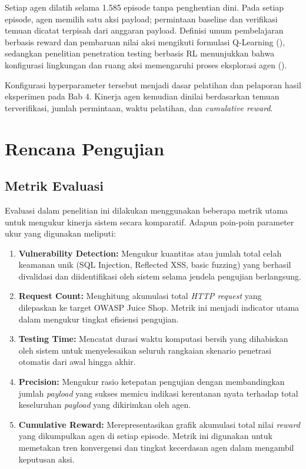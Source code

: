 Setiap agen dilatih selama 1.585 episode tanpa penghentian dini. Pada setiap episode, agen memilih satu aksi payload; permintaan baseline dan verifikasi temuan dicatat terpisah dari anggaran payload. Definisi umum pembelajaran berbasis reward dan pembaruan nilai aksi mengikuti formulasi Q-Learning (\cite{watkins1992qlearning,sutton2018}), sedangkan penelitian penetration testing berbasis RL menunjukkan bahwa konfigurasi lingkungan dan ruang aksi memengaruhi proses eksplorasi agen (\cite{ghanem2023hrl,zennaro2023}).

Konfigurasi hyperparameter tersebut menjadi dasar pelatihan dan pelaporan hasil eksperimen pada Bab 4. Kinerja agen kemudian dinilai berdasarkan temuan terverifikasi, jumlah permintaan, waktu pelatihan, dan \textit{cumulative reward}.

\section{Rencana Pengujian}

\subsection{Metrik Evaluasi}

Evaluasi dalam penelitian ini dilakukan menggunakan beberapa metrik utama untuk mengukur kinerja sistem secara komparatif. Adapun poin-poin parameter ukur yang digunakan meliputi:

\begin{enumerate}
    \item \textbf{Vulnerability Detection:} Mengukur kuantitas atau jumlah total celah keamanan unik (SQL Injection, Reflected XSS, basic fuzzing) yang berhasil divalidasi dan diidentifikasi oleh sistem selama jendela pengujian berlangsung.
    \item \textbf{Request Count:} Menghitung akumulasi total \textit{HTTP request} yang dilepaskan ke target OWASP Juice Shop. Metrik ini menjadi indicator utama dalam mengukur tingkat efisiensi pengujian.
    \item \textbf{Testing Time:} Mencatat durasi waktu komputasi bersih yang dihabiskan oleh sistem untuk menyelesaikan seluruh rangkaian skenario penetrasi otomatis dari awal hingga akhir.
    \item \textbf{Precision:} Mengukur rasio ketepatan pengujian dengan membandingkan jumlah \textit{payload} yang sukses memicu indikasi kerentanan nyata terhadap total keseluruhan \textit{payload} yang dikirimkan oleh agen.
    \item \textbf{Cumulative Reward:} Merepresentasikan grafik akumulasi total nilai \textit{reward} yang dikumpulkan agen di setiap episode. Metrik ini digunakan untuk memetakan tren konvergensi dan tingkat kecerdasan agen dalam mengambil keputusan aksi.
\end{enumerate}

